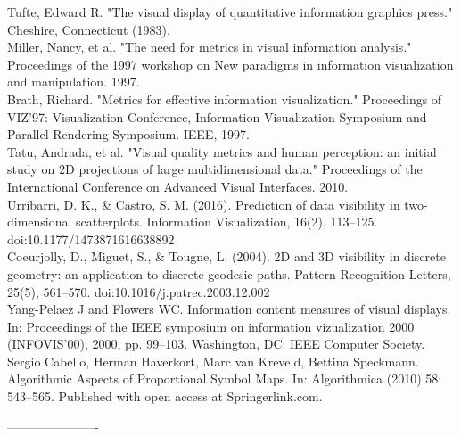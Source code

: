 \documentclass[a4paper,11pt]{article}
\begin{document}
\newpage

\begin{thebibliography}{999}

Tufte, Edward R. "The visual display of quantitative information graphics press." Cheshire, Connecticut (1983).\\

Miller, Nancy, et al. "The need for metrics in visual information analysis." Proceedings of the 1997 workshop on New paradigms in information visualization and manipulation. 1997.\\

Brath, Richard. "Metrics for effective information visualization." Proceedings of VIZ'97: Visualization Conference, Information Visualization Symposium and Parallel Rendering Symposium. IEEE, 1997.\\

Tatu, Andrada, et al. "Visual quality metrics and human perception: an initial study on 2D projections of large multidimensional data." Proceedings of the International Conference on Advanced Visual Interfaces. 2010.\\

Urribarri, D. K., \& Castro, S. M. (2016). Prediction of data visibility in two-dimensional scatterplots. Information Visualization, 16(2), 113–125. doi:10.1177/1473871616638892\\

Coeurjolly, D., Miguet, S., \& Tougne, L. (2004). 2D and 3D visibility in discrete geometry: an application to discrete geodesic paths. Pattern Recognition Letters, 25(5), 561–570. doi:10.1016/j.patrec.2003.12.002\\

Yang-Pelaez J and Flowers WC. Information content
measures of visual displays. In: Proceedings of the IEEE symposium on information vizualization 2000 (INFOVIS’00), 2000, pp. 99–103. Washington, DC: IEEE Computer Society.\\

Sergio Cabello, Herman Haverkort, Marc van Kreveld, Bettina Speckmann. Algorithmic Aspects of Proportional Symbol Maps. In: Algorithmica (2010) 58: 543–565. Published with open access at Springerlink.com.%



\end{thebibliography}

  ----------------------
\end{document}
